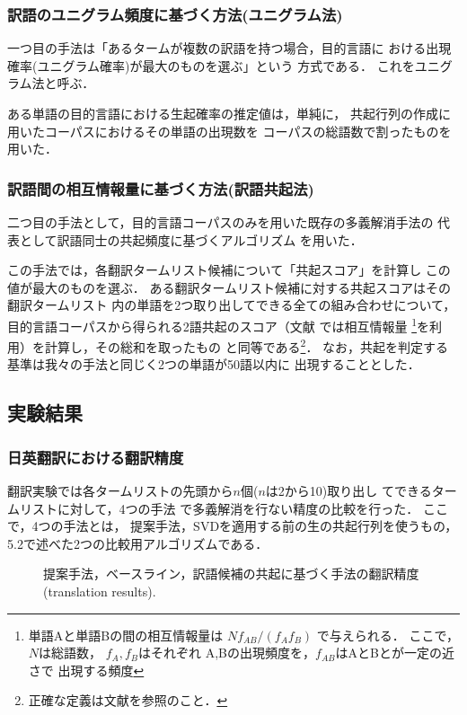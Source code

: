 \subsubsection{訳語のユニグラム頻度に基づく方法(ユニグラム法)}

一つ目の手法は「あるタームが複数の訳語を持つ場合，目的言語に
おける出現確率(ユニグラム確率)が最大のものを選ぶ」という
方式である． 
これをユニグラム法と呼ぶ． 

ある単語の目的言語における生起確率の推定値は，単純に，
共起行列の作成に用いたコーパスにおけるその単語の出現数を
コーパスの総語数で割ったものを用いた．

\subsubsection{訳語間の相互情報量に基づく方法(訳語共起法)}

二つ目の手法として，目的言語コーパスのみを用いた既存の多義解消手法の
代表として訳語同士の共起頻度に基づくアルゴリズム \cite{Tanaka96}
を用いた． 

この手法では，各翻訳タームリスト候補について「共起スコア」を計算し
この値が最大のものを選ぶ． 
ある翻訳タームリスト候補に対する共起スコアはその翻訳タームリスト
内の単語を2つ取り出してできる全ての組み合わせについて，
目的言語コーパスから得られる2語共起のスコア（文献
\cite{Tanaka96}では相互情報量
\footnote{単語Aと単語Bの間の相互情報量は
$ N f_{AB} / (f_A f_B)$ で与えられる． ここで，$N$は総語数，
$f_A, f_B$はそれぞれ A,Bの出現頻度を，$f_{AB}$はAとBとが一定の近さで
出現する頻度}を利用）を計算し，その総和を取ったもの
と同等である\footnote{正確な定義は文献\cite{Tanaka96}を参照のこと． }． 
なお，共起を判定する基準は我々の手法と同じく2つの単語が50語以内に
出現することとした． 

\subsection{実験結果}

\subsubsection{日英翻訳における翻訳精度}

  翻訳実験では各タームリストの先頭から$n$個($n$は2から10)取り出し
てできるタームリストに対して，4つの手法
で多義解消を行ない精度の比較を行った． ここで，4つの手法とは，
提案手法，SVDを適用する前の生の共起行列を使うもの，
5.2で述べた2つの比較用アルゴリズムである． 

\begin{figure*}[t]
\begin{center}
\end{center}
\caption{提案手法，ベースライン，訳語候補の共起に基づく手法の翻訳精度(translation results).}
\label{Fig.Trans}
\end{figure*}

